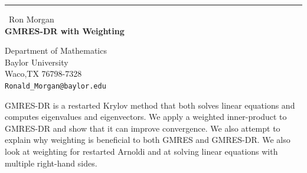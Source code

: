 \documentclass{report}
\begin{document}
\begin{center}
\rule{6in}{1pt} \
{\large Ron Morgan \\
{\bf GMRES-DR with Weighting}}

Department of Mathematics \\ Baylor University \\ Waco,TX 76798-7328
\\
{\tt Ronald\_Morgan@baylor.edu}\end{center}

GMRES-DR is a restarted Krylov method that both solves linear equations
and computes eigenvalues and eigenvectors. We apply a weighted
inner-product to GMRES-DR and show that it can improve convergence. We
also attempt to explain why weighting is beneficial to both GMRES and
GMRES-DR. We also look at weighting for restarted Arnoldi and at solving
linear equations with multiple right-hand sides.
\end{document}
